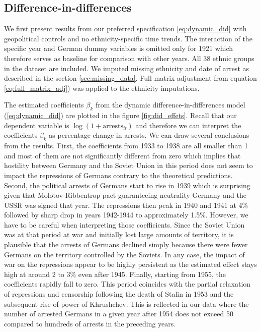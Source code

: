 \subsection{Difference-in-differences}
We first present results from our preferred specification \ref{eq:dynamic_did} with geopolitical controls and no ethnicity-specific time trends. 
The interaction of the specific year and German dummy variables is omitted only for 1921 which therefore serves as baseline for comparison with other years. 
All 38 ethnic groups in the dataset are included. 
We imputed missing ethnicity and date of arrest as described in the section \ref{sec:missing_data}.  Full matrix adjustment from equation \ref{eq:full_matrix_adj}) was applied to the ethnicity imputations. 

 The estimated coefficients  $\beta_k$ from the dynamic difference-in-differences model (\ref{eq:dynamic_did}) are plotted in the figure \ref{fig:did_effets}. Recall that our dependent variable  is $\log\left(1 + \text{arrests}_{it}\right)$ and therefore we can interpret the coefficients  $\beta_k$  as percentage change in arrests.
 We can draw several conclusions from the results. 
 First, the coefficients from 1933 to 1938 are all smaller than 1 and most of them are not significantly different from zero which implies that hostility between Germany and the Soviet Union in this period does not seem to impact the repressions of Germans contrary to the theoretical predictions. Second, the political arrests of Germans start to rise in 1939 which is surprising given that  Molotov-Ribbentrop pact guaranteeing neutrality Germany and the USSR was signed that year. The repressions then peak  in 1940 and 1941  at 4\%
  followed by sharp drop in years 1942-1944 to approximately 1.5\%. 
  However,  we have to be careful when interpreting those coefficients. 
 Since the Soviet Union was at that period at war and initially lost large amounts of territory, it is plausible that the arrests of Germans  declined simply because there were fewer Germans on the territory controlled by the Soviets. 
 In any case,  the impact of war on the repressions appear to be highly persistent as 
  the estimated effect stays high at around 2 to 3\% even after 1945.
Finally,  starting from 1955, the coefficients rapidly fall to zero. 
This period coincides with the partial relaxation of repressions and censorship following the death of Stalin in 1953 and the subsequent  rise of power of Khrushchev. 
This is reflected in our data where the number of arrested Germans in a given year after 1954 does not exceed 50 compared to hundreds of arrests in the preceding years.  


